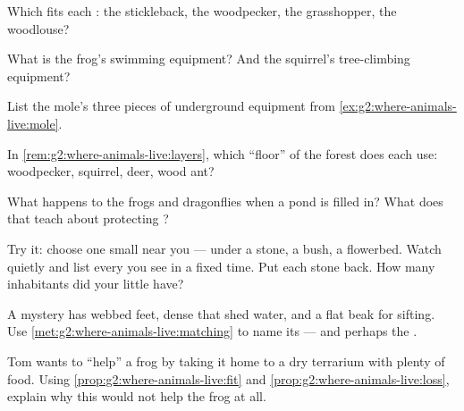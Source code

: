 \begin{exercise}[$\star$]\label{exo:g2:where-animals-live:3}
Which  fits each : the stickleback, the woodpecker,
the grasshopper, the woodlouse?
\end{exercise}

\begin{exercise}[$\star$]\label{exo:g2:where-animals-live:4}
What is the frog's swimming equipment? And the squirrel's
tree-climbing equipment?
\end{exercise}

\begin{exercise}[$\star$]\label{exo:g2:where-animals-live:5}
List the mole's three pieces of underground equipment from
\cref{ex:g2:where-animals-live:mole}.
\end{exercise}

\begin{exercise}[$\star$]\label{exo:g2:where-animals-live:6}
In \cref{rem:g2:where-animals-live:layers}, which ``floor'' of
the forest does each  use: woodpecker, squirrel, deer, wood
ant?
\end{exercise}

\begin{exercise}[$\star$]\label{exo:g2:where-animals-live:7}
What happens to the frogs and dragonflies when a pond is filled
in? What does that teach about protecting ?
\end{exercise}

\begin{exercise}[$\star$]\label{exo:g2:where-animals-live:8}
Try it: choose one small  near you --- under a stone, a
bush, a flowerbed. Watch quietly and list every  you see in
a fixed time. Put each stone back. How many inhabitants did your
little  have?
\end{exercise}

\begin{exercise}[$\star\star$]\label{exo:g2:where-animals-live:9}
A mystery  has webbed feet, dense  that shed
water, and a flat beak for sifting. Use
\cref{met:g2:where-animals-live:matching} to name its  ---
and perhaps the .
\end{exercise}

\begin{exercise}[$\star\star$]\label{exo:g2:where-animals-live:10}
Tom wants to ``help'' a frog by taking it home to a dry terrarium
with plenty of food. Using
\cref{prop:g2:where-animals-live:fit} and
\cref{prop:g2:where-animals-live:loss}, explain why this would
not help the frog at all.
\end{exercise}
